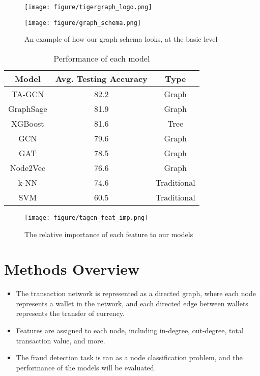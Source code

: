 \documentclass[article,36pt,extrafontsizes,oneside,openany,oldfontcommands]{memoir}
\begin{document}
\begin{adjmulticols*}{3}{0.5in}{0.5in}
\columnbreak
\begin{figure}
	\centering
	\begin{minipage}{0.45\linewidth}
		\texttt{[image: figure/tigergraph\_logo.png]}
	\end{minipage}\hfill
\end{figure}
\begin{figure}
	\centering
	\texttt{[image: figure/graph\_schema.png]}
	\caption{An example of how our graph schema looks, at the basic level}
\end{figure}
\begin{table}
	\centering
	\begin{tabular}{ |c|c|c| } 
		\hline
		Model & Avg. Testing Accuracy & Type \\
		\hline \hline
		TA-GCN & 82.2 & Graph \\ 
		\hline
 		GraphSage & 81.9 & Graph \\ 
		\hline
		XGBoost & 81.6 & Tree \\ 
		\hline
		GCN & 79.6 & Graph \\ 
		\hline
		GAT & 78.5 & Graph \\ 
		\hline
		Node2Vec & 76.6 & Graph \\ 
		\hline
		k-NN & 74.6 & Traditional \\ 
		\hline
		SVM & 60.5 & Traditional \\ 
		\hline
	\end{tabular}
	\caption{Performance of each model}
\end{table}
\begin{figure}
	\centering
	\texttt{[image: figure/tagcn\_feat\_imp.png]}
	\caption{The relative importance of each feature to our models}
\end{figure}
\columnbreak

\section{Methods Overview}
\begin{adjustwidth}{0.1in}{0in}
\begin{itemize}[topsep=0pt,itemsep=0ex,partopsep=0ex,parsep=0ex]
\item The transaction network is represented as a directed graph, where each node represents a wallet in the network, and each directed edge between wallets represents the transfer of currency.
\item Features are assigned to each node, including in-degree, out-degree, total transaction value, and more.
\item The fraud detection task is ran as a node classification problem, and the performance of the models will be evaluated.
\end{itemize} 
\end{adjustwidth}



\end{adjmulticols*}
\end{document}

